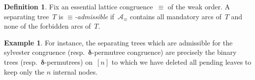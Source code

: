 \documentclass{amsart}
\theoremstyle{definition}
\newtheorem{definition}[theorem]{Definition}
\newtheorem{example}[theorem]{Example}
\renewcommand{\b}[1]{{\boldsymbol{#1}}} %
\newcommand{\darkblue}{\color{darkblue}} %
\newcommand{\defn}[1]{\textsl{\darkblue #1}} %
\newcommand{\arcs}{{\mathcal{A}}} %
\newcommand{\decoration}{{\b{\delta}}} %
\begin{document}
%

\begin{definition}
\label{def:admissibleSeparatingTrees}
Fix an essential lattice congruence~$\equiv$ of the weak order.
A separating tree~$T$ is \defn{$\equiv$-admissible} if~$\arcs_\equiv$ contains all mandatory arcs of~$T$ and none of the forbidden arcs of~$T$.
\end{definition}

\begin{example}
For instance, the separating trees which are admissible for the sylvester congruence (resp.~$\decoration$-permutree congruence) are precisely the binary trees (resp.~$\decoration$-permutrees) on~$[n]$ to which we have deleted all pending leaves to keep only the $n$ internal nodes.
\end{example}
\end{document}
